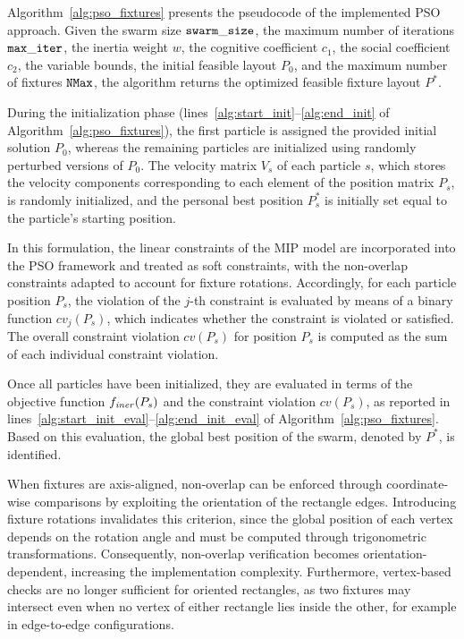 Algorithm~\ref{alg:pso_fixtures} presents the pseudocode of the implemented PSO approach. Given the swarm size \(\mathtt{swarm\_size}\), the maximum number of iterations \(\mathtt{max\_iter}\), the inertia weight \(w\), the cognitive coefficient \(c_1\), the social coefficient \(c_2\), the variable bounds, the initial feasible layout \(P_0\), and the maximum number of fixtures \(\mathtt{NMax}\), the algorithm returns the optimized feasible fixture layout \(P^*\).

During the initialization phase (lines~\ref{alg:start_init}--\ref{alg:end_init} of Algorithm~\ref{alg:pso_fixtures}), the first particle is assigned the provided initial solution $P_0$, whereas the remaining particles are initialized using randomly perturbed versions of $P_0$. The velocity matrix $V_s$ of each particle $s$, which stores the velocity components corresponding to each element of the position matrix $P_s$, is randomly initialized, and the personal best position $P^*_s$ is initially set equal to the particle’s starting position.

In this formulation, the linear constraints of the MIP model are incorporated into the PSO framework and treated as soft constraints, with the non-overlap constraints adapted to account for fixture rotations. Accordingly, for each particle position $P_s$, the violation of the $j$-th constraint is evaluated by means of a binary function $cv_j(P_s)$, which indicates whether the constraint is violated or satisfied. The overall constraint violation $cv(P_s)$ for position $P_s$ is computed as the sum of each individual constraint violation.

Once all particles have been initialized, they are evaluated in terms of the objective function $f_\mathit{iner}(P_s)$ and the constraint violation $cv(P_s)$, as reported in lines~\ref{alg:start_init_eval}--\ref{alg:end_init_eval} of Algorithm~\ref{alg:pso_fixtures}. Based on this evaluation, the global best position of the swarm, denoted by $P^*$, is identified.

When fixtures are axis-aligned, non-overlap can be enforced through coordinate-wise comparisons by exploiting the orientation of the rectangle edges. Introducing fixture rotations invalidates this criterion, since the global position of each vertex depends on the rotation angle and must be computed through trigonometric transformations. Consequently, non-overlap verification becomes orientation-dependent, increasing the implementation complexity. Furthermore, vertex-based checks are no longer sufficient for oriented rectangles, as two fixtures may intersect even when no vertex of either rectangle lies inside the other, for example in edge-to-edge configurations.


